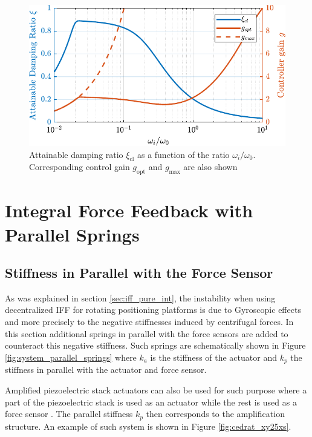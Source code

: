 \documentclass{ISMA_USD2020}
\begin{document}
\begin{figure}[htbp]
\centering
\includegraphics[scale=1]{figs/mod_iff_damping_wi.pdf}
\caption{\label{fig:mod_iff_damping_wi}Attainable damping ratio \(\xi_\text{cl}\) as a function of the ratio \(\omega_i/\omega_0\). Corresponding control gain \(g_\text{opt}\) and \(g_\text{max}\) are also shown}
\end{figure}

\section{Integral Force Feedback with Parallel Springs}
\label{sec:orgb9e95b0}
\label{sec:iff_kp}
\subsection{Stiffness in Parallel with the Force Sensor}
\label{sec:org3fd6edd}
As was explained in section \ref{sec:iff_pure_int}, the instability when using decentralized IFF for rotating positioning platforms is due to Gyroscopic effects and more precisely to the negative stiffnesses induced by centrifugal forces.
In this section additional springs in parallel with the force sensors are added to counteract this negative stiffness.
Such springs are schematically shown in Figure \ref{fig:system_parallel_springs} where \(k_a\) is the stiffness of the actuator and \(k_p\) the stiffness in parallel with the actuator and force sensor.

Amplified piezoelectric stack actuators can also be used for such purpose where a part of the piezoelectric stack is used as an actuator while the rest is used as a force sensor \cite{souleille18_concep_activ_mount_space_applic}.
The parallel stiffness \(k_p\) then corresponds to the amplification structure.
An example of such system is shown in Figure \ref{fig:cedrat_xy25xs}.
\end{document}
